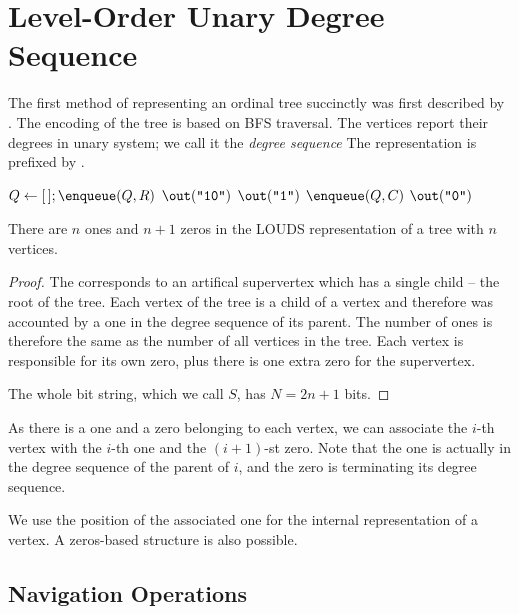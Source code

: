 \section{Level-Order Unary Degree Sequence}

The first method of representing an ordinal tree succinctly was first described by \cite{jacobson1989space}.
The encoding of the tree is based on BFS traversal.
The vertices report their degrees in unary system; we call it the \emph{degree sequence}
The representation is prefixed by .

\begin{algorithm}
\begin{algorithmic}
	\State $Q \gets [\,]; \enqueue(Q, R)$ 
	\State $\out(\str{10})$
			\State $\out(\str1)$
			\State $\enqueue(Q, C)$
		\EndFor
		\State $\out(\str0)$
	\EndWhile
\EndFunction
\end{algorithmic}
\end{algorithm}

\begin{lemma}
	There are $n$ ones and $n+1$ zeros in the LOUDS representation of a tree with $n$ vertices.
\end{lemma}
\begin{proof}
	The  corresponds to an artifical supervertex which has a single child -- the root of the tree.
	Each vertex of the tree is a child of a vertex and therefore was accounted by a one in the degree sequence of its parent.
	The number of ones is therefore the same as the number of all vertices in the tree.
	Each vertex is responsible for its own zero, plus there is one extra zero for the supervertex.
	
	The whole bit string, which we call $S$, has $N = 2n + 1$ bits.
\end{proof}

As there is a one and a zero belonging to each vertex, we can associate the $i$-th vertex with the $i$-th one and the $(i+1)$-st zero.
Note that the one is actually in the degree sequence of the parent of $i$, and the zero is terminating its degree sequence.

We use the position of the associated one for the internal representation of a vertex.
A zeros-based structure is also possible. \cite{rahman2006engineering}

\subsection{Navigation Operations}

